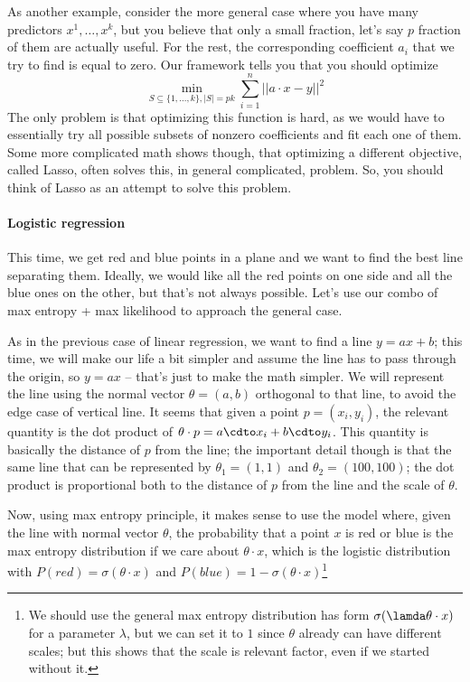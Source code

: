 \documentclass{article}
\begin{document}
As another example, consider the more general case where you have many predictors $x^1, \dots, x^k$, but you believe that only a small fraction, let's say $p$ fraction of them are actually useful. For the rest, the corresponding coefficient $a_i$ that we try to find is equal to zero. Our framework tells you that you should optimize
\[
\min_{S \subseteq \{1, \dots, k\}, |S|=pk} \sum_{i=1}^n ||a\cdot x - y||^2
\]
The only problem is that optimizing this function is hard, as we would have to essentially try all possible subsets of nonzero coefficients and fit each one of them. Some more complicated math shows though, that optimizing a different objective, called Lasso, often solves this, in general complicated, problem. So, you should think of Lasso as an attempt to solve this problem. 

\paragraph{Logistic regression}

This time, we get red and blue points in a plane and we want to find the best line separating them. Ideally, we would like all the red points on one side and all the blue ones on the other, but that's not always possible. Let's use our combo of max entropy + max likelihood to approach the general case. 

As in the previous case of linear regression, we want to find a line $y = ax + b$; this time, we will make our life a bit simpler and assume the line has to pass through the origin, so $y = ax$ -- that's just to make the math simpler. We will represent the line using the normal vector $\theta = (a, b)$ orthogonal to that line, to avoid the edge case of vertical line. It seems that given a point $p = (x_i, y_i)$, the relevant quantity is the dot product of $\theta \cdot p = a\cdto x_i + b\cdto y_i$. This quantity is basically the distance of $p$ from the line; the important detail though is that the same line that can be represented by $\theta_1 = (1,1)$ and $\theta_2=(100,100)$; the dot product is proportional both to the distance of $p$ from the line and the scale of $\theta$. 

Now, using max entropy principle, it makes sense to use the model where, given the line with normal vector $\theta$, the probability that a point $x$ is red or blue is the max entropy distribution if we care about $\theta \cdot x$, which is the logistic distribution with $P(red) = \sigma(\theta\cdot x)$ and $P(blue) = 1 - \sigma(\theta \cdot x)$\footnote{We should use the general max entropy distribution has form $\sigma(\lamda\theta\cdot x)$ for a parameter $\lambda$, but we can set it to $1$ since $\theta$ already can have different scales; but this shows that the scale is relevant factor, even if we started without it. }
\end{document}
